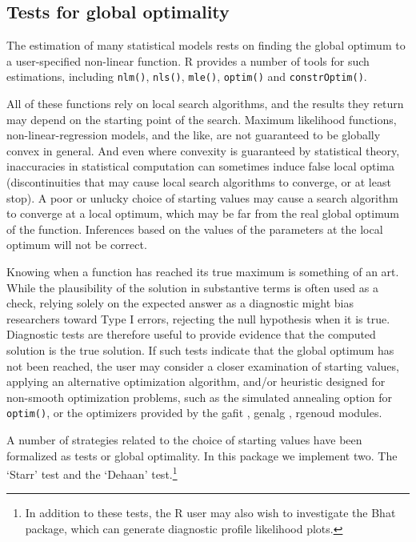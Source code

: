 \documentclass[11pt]{article}
\let\code=\texttt
\let\proglang=\textsf
\newcommand{\pkg}[1]{{\normalfont\fontseries{b}\selectfont #1}}
\begin{document}
\subsection{Tests for global optimality}

The estimation of many statistical models rests on finding the global optimum
to a user-specified non-linear function. R provides a number of tools for such
estimations, including \code{nlm()}, \code{nls()}, \code{mle()}, 
\code{optim()} and \code{constrOptim()}. 

All of these functions rely on local search algorithms, and the results they
return may depend on the starting point of the search. Maximum likelihood functions, non-linear-regression models, and the like, are not guaranteed to 
be globally convex in general. And even where convexity is guaranteed by statistical theory, inaccuracies in statistical computation can sometimes induce false local optima (discontinuities that may cause local search algorithms to converge, or at least stop). A poor or unlucky choice of starting values may cause a search algorithm to converge at a local optimum, which may be far from the real global optimum of the function. Inferences based on the values of the parameters at the local optimum will not be correct. 

Knowing when a function has reached its true maximum is
something of an art. While the plausibility of the solution
in substantive terms is often used as a check, relying solely on the expected
answer as a diagnostic might bias researchers toward Type I errors, rejecting the null hypothesis when it is true. Diagnostic
tests are therefore useful to provide evidence that the computed
solution is the true solution. If such tests indicate that the global optimum has not been reached, the user may consider a closer examination of starting values, applying an alternative optimization algorithm, and/or heuristic designed for non-smooth optimization problems, such as the simulated annealing option for \code{optim()}, or the optimizers provided by the \pkg{gafit} \citep{gafit02}, \pkg{genalg} \citep{genalg05}, \pkg{rgenoud}  \citep{rgenoud07} modules.

A number of strategies related to the choice of starting values have been formalized as tests 
or global optimality. In this package we implement two. The `Starr' test and the `Dehaan' 
	test.\footnote{In addition to these tests, the \proglang{R} user may also wish to 
	investigate the \pkg{Bhat} \citep{bhat05} package, which can generate diagnostic profile likelihood 
	plots.} 
 
\end{document}
